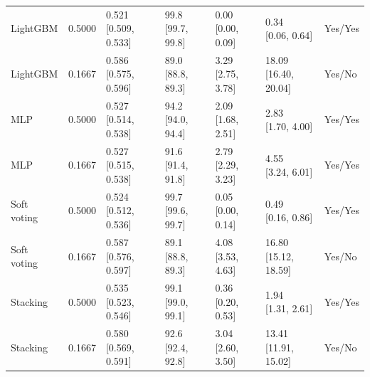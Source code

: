 \begin{table}[htbp]
{\begin{tabular}{lllllll}
LightGBM & 0.5000 & \shortstack{{0.521} \\ {[0.509, 0.533]}} & \shortstack{{99.8} \\ {[99.7, 99.8]}} & \shortstack{{0.00} \\ {[0.00, 0.09]}} & \shortstack{{0.34} \\ {[0.06, 0.64]}} & Yes/Yes \\
LightGBM & 0.1667 & \shortstack{{0.586} \\ {[0.575, 0.596]}} & \shortstack{{89.0} \\ {[88.8, 89.3]}} & \shortstack{{3.29} \\ {[2.75, 3.78]}} & \shortstack{{18.09} \\ {[16.40, 20.04]}} & Yes/No \\
MLP & 0.5000 & \shortstack{{0.527} \\ {[0.514, 0.538]}} & \shortstack{{94.2} \\ {[94.0, 94.4]}} & \shortstack{{2.09} \\ {[1.68, 2.51]}} & \shortstack{{2.83} \\ {[1.70, 4.00]}} & Yes/Yes \\
MLP & 0.1667 & \shortstack{{0.527} \\ {[0.515, 0.538]}} & \shortstack{{91.6} \\ {[91.4, 91.8]}} & \shortstack{{2.79} \\ {[2.29, 3.23]}} & \shortstack{{4.55} \\ {[3.24, 6.01]}} & Yes/Yes \\
Soft voting & 0.5000 & \shortstack{{0.524} \\ {[0.512, 0.536]}} & \shortstack{{99.7} \\ {[99.6, 99.7]}} & \shortstack{{0.05} \\ {[0.00, 0.14]}} & \shortstack{{0.49} \\ {[0.16, 0.86]}} & Yes/Yes \\
Soft voting & 0.1667 & \shortstack{{0.587} \\ {[0.576, 0.597]}} & \shortstack{{89.1} \\ {[88.8, 89.3]}} & \shortstack{{4.08} \\ {[3.53, 4.63]}} & \shortstack{{16.80} \\ {[15.12, 18.59]}} & Yes/No \\
Stacking & 0.5000 & \shortstack{{0.535} \\ {[0.523, 0.546]}} & \shortstack{{99.1} \\ {[99.0, 99.1]}} & \shortstack{{0.36} \\ {[0.20, 0.53]}} & \shortstack{{1.94} \\ {[1.31, 2.61]}} & Yes/Yes \\
Stacking & 0.1667 & \shortstack{{0.580} \\ {[0.569, 0.591]}} & \shortstack{{92.6} \\ {[92.4, 92.8]}} & \shortstack{{3.04} \\ {[2.60, 3.50]}} & \shortstack{{13.41} \\ {[11.91, 15.02]}} & Yes/No \\
\bottomrule
\end{tabular}
}
\end{table}
